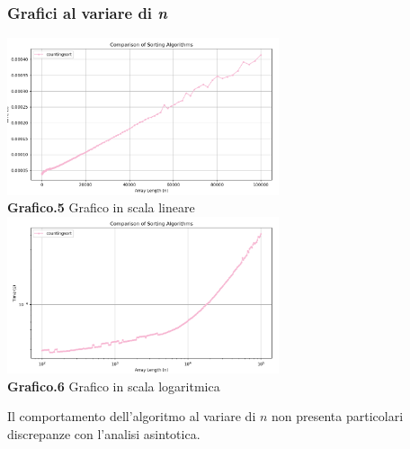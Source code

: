 \documentclass{article}
\begin{document}
        \subsubsection{Grafici al variare di \textit{n}}
            \begin{center}
                \includegraphics[width=0.6\textwidth]{Countingsort.png} \\
                \textbf{Grafico.5} Grafico in scala lineare\\
                \vspace{0.5cm}
                \includegraphics[width=0.6\textwidth]{Countingsort_Log.png} \\
                \textbf{Grafico.6} Grafico in scala logaritmica\\
            \end{center}
            Il comportamento dell'algoritmo al variare di $n$ non presenta particolari discrepanze con l'analisi asintotica.
            
\end{document}
